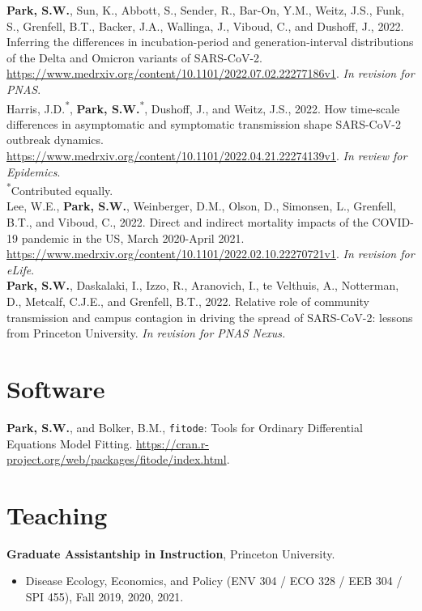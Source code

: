 \documentclass[11pt]{article} %
\begin{document}
 \textbf{Park, S.W.}, Sun, K., Abbott, S., Sender, R., Bar-On, Y.M., Weitz, J.S., Funk, S., Grenfell, B.T., Backer, J.A., Wallinga, J., Viboud, C., and Dushoff, J., 2022. Inferring the differences in incubation-period and generation-interval distributions of the Delta and Omicron variants of SARS-CoV-2. \url{https://www.medrxiv.org/content/10.1101/2022.07.02.22277186v1}. \textit{In revision for PNAS}.\\

 Harris, J.D.\textsuperscript{*}, \textbf{Park, S.W.}\textsuperscript{*}, Dushoff, J., and Weitz, J.S., 2022. How time-scale differences in asymptomatic and symptomatic transmission shape SARS-CoV-2 outbreak dynamics. \url{https://www.medrxiv.org/content/10.1101/2022.04.21.22274139v1}. \textit{In review for Epidemics}.\\
\textsuperscript{*}Contributed equally.\\

 Lee, W.E., \textbf{Park, S.W.}, Weinberger, D.M., Olson, D., Simonsen, L., Grenfell, B.T., and Viboud, C., 2022. Direct and indirect mortality impacts of the COVID-19 pandemic in the US, March 2020-April 2021. \url{https://www.medrxiv.org/content/10.1101/2022.02.10.22270721v1}. \textit{In revision for eLife}.\\

 \textbf{Park, S.W.}, Daskalaki, I., Izzo, R., Aranovich, I., te Velthuis, A., Notterman, D., Metcalf, C.J.E., and Grenfell, B.T., 2022. Relative role of community transmission and campus contagion in driving the spread of SARS-CoV-2: lessons from Princeton University. \textit{In revision for PNAS Nexus.}

\section*{Software}

 \textbf{Park, S.W.}, and Bolker, B.M., \texttt{fitode}: Tools for Ordinary Differential Equations Model Fitting. \url{https://cran.r-project.org/web/packages/fitode/index.html}.

\section*{Teaching}

 \textbf{Graduate Assistantship in Instruction}, Princeton University.
\begin{itemize}
  \item Disease Ecology, Economics, and Policy (ENV 304 / ECO 328 / EEB 304 / SPI 455), Fall 2019, 2020, 2021.
\end{itemize}
\end{document}
